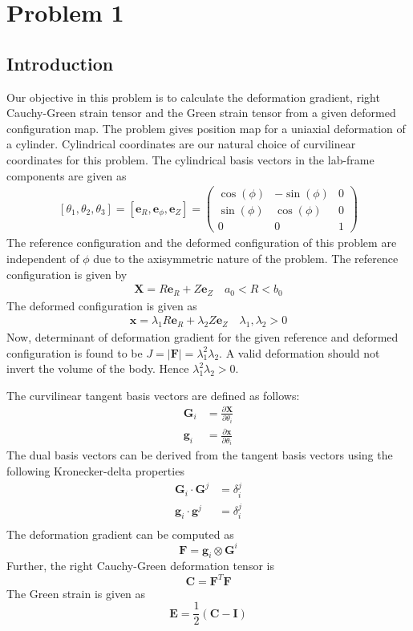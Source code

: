 \documentclass[../main.tex]{subfiles}
\begin{document}
\lstset{language=Matlab}
\section{Problem 1}
\subsection{Introduction} Our objective in this problem is to
calculate the deformation gradient, right Cauchy-Green strain tensor
and the Green strain tensor from a given deformed configuration map.
The problem gives position map for a uniaxial deformation of a
cylinder. Cylindrical coordinates are our natural choice of
curvilinear coordinates for this problem. The cylindrical basis
vectors in the lab-frame components are given as
\begin{align*}
  \left[\theta_1,\theta_2,\theta_3\right]=\left[\mathbf{e}_R,\mathbf{e}_{\phi},\mathbf{e}_Z\right] =
  \begin{pmatrix}
    \cos(\phi) & -\sin(\phi) & 0\\
    \sin(\phi) & \cos(\phi) & 0\\
    0 & 0 & 1
  \end{pmatrix}
\end{align*}
The reference configuration and the deformed configuration of this
problem are independent of $\phi$ due to the axisymmetric nature of
the problem. The reference configuration is given by
\begin{align*}
  \mathbf{X} = R\mathbf{e}_R + Z\mathbf{e}_Z\quad a_0<R<b_0
\end{align*}
The deformed configuration is given as
\begin{align*}
  \mathbf{x} = \lambda_1R\mathbf{e}_R+\lambda_2Z\mathbf{e}_Z\quad \lambda_1,\lambda_2 > 0
\end{align*}
Now, determinant of deformation gradient for the given reference and
deformed configuration is found to be
$J = |\mathbf{F}| = \lambda_1^2\lambda_2$. A valid deformation should
not invert the volume of the body. Hence $\lambda_1^2\lambda_2 > 0$.

The curvilinear tangent basis vectors are defined as follows:
\begin{align*}
  \mathbf{G}_i &= \frac{\partial\mathbf{X}}{\partial\theta_i}\\
  \mathbf{g}_i &=\frac{\partial\mathbf{x}}{\partial\theta_i}
\end{align*}
The dual basis vectors can be derived from the tangent basis vectors
using the following Kronecker-delta properties
\begin{align*}
  \mathbf{G}_i\cdot\mathbf{G}^j &= \delta_i^j\\
  \mathbf{g}_i\cdot\mathbf{g}^j &= \delta_i^j\\
\end{align*}
The deformation gradient can be computed as
\[\mathbf{F} = \mathbf{g}_i\otimes\mathbf{G}^i\]
Further, the right Cauchy-Green deformation tensor is
\[\mathbf{C}=\mathbf{F}^T\mathbf{F} \]
The Green strain is given as
\[\mathbf{E}= \frac{1}{2}(\mathbf{C}-\mathbf{I})\]
\end{document}
